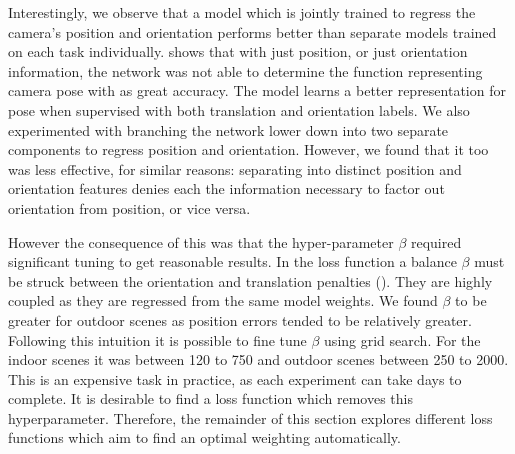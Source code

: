 Interestingly, we observe that a model which is jointly trained to regress the camera's position and orientation performs better than separate models trained on each task individually.  shows that with just position, or just orientation information, the network was not able to determine the function representing camera pose with as great accuracy. The model learns a better representation for pose when supervised with both translation and orientation labels. We also experimented with branching the network lower down into two separate components to regress position and orientation. However, we found that it too was less effective, for similar reasons: separating into distinct position and orientation features denies each the information necessary to factor out orientation from position, or vice versa.

However the consequence of this was that the hyper-parameter $\beta$ required significant tuning to get reasonable results. In the loss function  a balance $\beta$ must be struck between the orientation and translation penalties (). They are highly coupled as they are regressed from the same model weights. We found $\beta$ to be greater for outdoor scenes as position errors tended to be relatively greater. Following this intuition it is possible to fine tune $\beta$ using grid search. For the indoor scenes it was between 120 to 750 and outdoor scenes between 250 to 2000. This is an expensive task in practice, as each experiment can take days to complete. It is desirable to find a loss function which removes this hyperparameter. Therefore, the remainder of this section explores different loss functions which aim to find an optimal weighting automatically.

